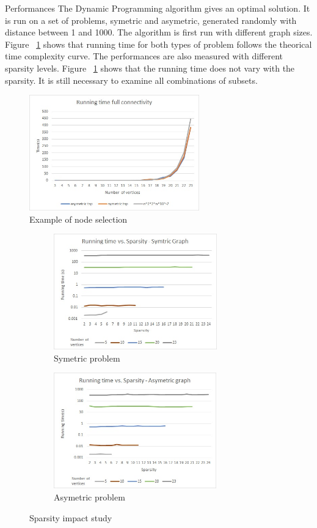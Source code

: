 \documentclass[../report.tex]{subfiles}
\begin{document}
\begin{subsection}{Performances}
The Dynamic Programming algorithm gives an optimal solution.
It is run on a set of problems, symetric and asymetric, generated randomly with distance between 1 and 1000. 
The algorithm is first run with different graph sizes. Figure ~\ref{fig:dpgraphsize} shows that running time for both types of problem follows the theorical time complexity curve.
The performances are also measured with different sparsity levels. Figure ~\ref{fig:dpgraphsize} shows that the running time does not vary with the sparsity. It is still necessary to examine all combinations of subsets.


\begin{figure}[H]
\centering
\includegraphics[height=5cm,valign=t]{dp_sizegraph.jpg}
\caption{Example of node selection \label{fig:dpgraphsize}}
\end{figure}

\begin{figure}[H]
\centering
\begin{subfigure}{.5\textwidth}
\includegraphics[height=5cm,valign=t]{dp_sym_sparsity.jpg}
\caption{Symetric problem \label{fig:dpgsparsitysym}}
\end{subfigure}%
\begin{subfigure}{.5\textwidth}
\includegraphics[height=5cm,valign=t]{dp_asym_sparsity.jpg}
\caption{Asymetric problem\label{fig:dpgsparsityasym}}
\end{subfigure}%
\caption{Sparsity impact study\label{fig:dpperf}}
\end{figure}


\end{subsection}
\end{document}

